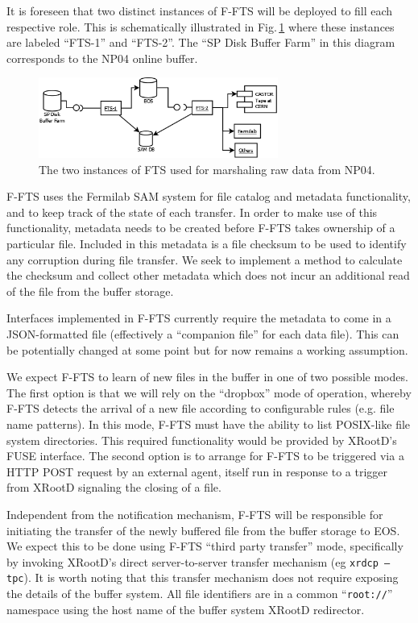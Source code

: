 \documentclass[pdftex,12pt,letter]{article}
\newcommand{\xrd}{XRootD\xspace}
\begin{document}
\noindent It is foreseen that two distinct instances of F-FTS will be deployed to fill each
respective role. This is schematically illustrated in Fig.\,\ref{fig:ftsinstances} where these instances are labeled ``FTS-1'' and ``FTS-2''.
The ``SP Disk Buffer Farm'' in this diagram corresponds to the NP04 online buffer.

\begin{figure}[tbh]
  \centering
  \includegraphics[width=0.7\textwidth]{figures/ftsinstances_v2.png}
  \caption{The two instances of FTS used for marshaling raw data from NP04.}
  \label{fig:ftsinstances}
\end{figure}

F-FTS uses the Fermilab SAM system for file catalog and metadata functionality,
and to keep track of the state of each transfer. In order to make use of this functionality, metadata
needs to be created before F-FTS takes ownership of a particular file. 
Included in this metadata is a file checksum to be used to identify any corruption during file transfer.
We seek to implement a method to calculate the checksum and collect other metadata which does 
not incur an additional read of the file from the buffer storage.

Interfaces implemented in F-FTS currently require the metadata to come in a JSON-formatted file
(effectively a ``companion file'' for each data file). This can be potentially changed at some point but
for now remains a working assumption.

We expect F-FTS to learn of new files in the buffer in one of two possible modes.  
%
The first option is that we will rely on the ``dropbox'' mode of
operation, whereby F-FTS detects the arrival of a new file according
to configurable rules (e.g. file name patterns). In this mode, F-FTS
must have the ability to list POSIX-like file system directories.
This required functionality would be provided by \xrd's FUSE
interface.
%
The second option is to arrange for F-FTS to be triggered via a HTTP
POST request by an external agent, itself run in response to a trigger
from \xrd signaling the closing of a file.

Independent from the notification mechanism, F-FTS will be responsible
for initiating the transfer of the newly buffered file from the buffer
storage to EOS.  We expect this to be done using F-FTS ``third party
transfer'' mode, specifically by invoking \xrd's direct
server-to-server transfer mechanism (eg \texttt{xrdcp --tpc}).  It is
worth noting that this transfer mechanism does not require exposing
the details of the buffer system.  All file identifiers are in a
common ``\texttt{root://}'' namespace using the host name of the
buffer system \xrd redirector.
\end{document}
